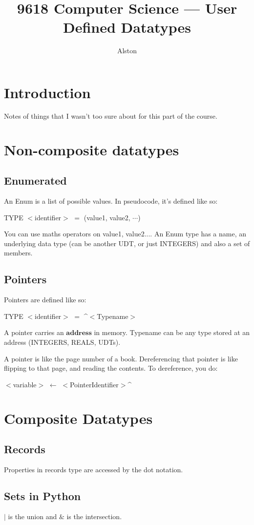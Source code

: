 \documentclass{article}
\title{9618 Computer Science — User Defined Datatypes}
\author{Alston}
\date{}
\theoremstyle{mytheoremstyle}
\theoremstyle{mytheoremstyle}
\theoremstyle{myproblemstyle}
\begin{document}
    \maketitle
    \section{Introduction}
    Notes of things that I wasn't too sure about for this part of the course.

    \section{Non-composite datatypes}
    \subsection{Enumerated}
    An Enum is a list of possible values. In pseudocode, it's defined like so:

    \begin{center}
        TYPE $<$identifier$>$ $=$ (value1, value2, $\cdots$) 
    \end{center}

    You can use maths operators on value1, value2.... An Enum type has a name, an underlying data type (can be another UDT, or just INTEGERS) and also a set of members.

    \subsection{Pointers}
    Pointers are defined like so:

    \begin{center}
        TYPE $<$identifier$>$ $=$ \^{}$<$Typename$>$
    \end{center}

    A pointer carries an $\textbf{address}$ in memory. Typename can be any type stored at an address (INTEGERS, REALS, UDTs).

    A pointer is like the page number of a book. Dereferencing that pointer is like flipping to that page, and reading the contents. To dereference, you do: 

    \begin{center}
        $<$variable$>$ $\leftarrow$ $<$PointerIdentifier$>$\^{} 
    \end{center}


    \section{Composite Datatypes}
    \subsection{Records}
    Properties in records type are accessed by the dot notation. 

    \subsection{Sets in Python}
    $\mid$ is the union and $\&$ is the intersection.
    
\end{document}

